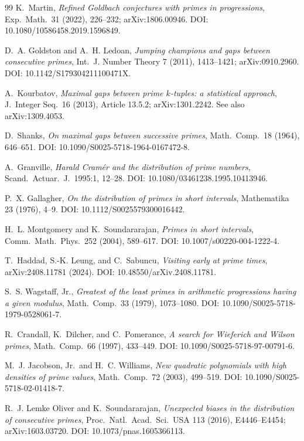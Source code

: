 \documentclass[11pt]{article}
\theoremstyle{definition}
\begin{document}
\begin{thebibliography}{99}
 K.~Martin,
\emph{Refined Goldbach conjectures with primes in progressions},
Exp.\ Math.\ 31 (2022), 226--232; arXiv:1806.00946.
DOI: 10.1080/10586458.2019.1596849.

 D.~A. Goldston and A.~H. Ledoan,
\emph{Jumping champions and gaps between consecutive primes},
Int.\ J. Number Theory 7 (2011), 1413--1421; arXiv:0910.2960.
DOI: 10.1142/S179304211100471X.

 A.~Kourbatov,
\emph{Maximal gaps between prime $k$-tuples: a statistical approach},
J.~Integer Seq.\ 16 (2013), Article 13.5.2; arXiv:1301.2242.  See also
arXiv:1309.4053.

 D.~Shanks,
\emph{On maximal gaps between successive primes},
Math.\ Comp.\ 18 (1964), 646--651.
DOI: 10.1090/S0025-5718-1964-0167472-8.

 A.~Granville,
\emph{Harald Cram\'er and the distribution of prime numbers},
Scand.\ Actuar.\ J.\ 1995:1, 12--28.
DOI: 10.1080/03461238.1995.10413946.

 P.~X. Gallagher,
\emph{On the distribution of primes in short intervals},
Mathematika 23 (1976), 4--9.  DOI: 10.1112/S0025579300016442.

 H.~L. Montgomery and K.~Soundararajan,
\emph{Primes in short intervals},
Comm.\ Math.\ Phys.\ 252 (2004), 589--617.
DOI: 10.1007/s00220-004-1222-4.

 T.~Haddad, S.-K. Leung, and C.~Sabuncu,
\emph{Visiting early at prime times}, arXiv:2408.11781 (2024).
DOI: 10.48550/arXiv.2408.11781.

 S.~S. Wagstaff, Jr.,
\emph{Greatest of the least primes in arithmetic progressions having a
given modulus}, Math.\ Comp.\ 33 (1979), 1073--1080.
DOI: 10.1090/S0025-5718-1979-0528061-7.

 R.~Crandall, K.~Dilcher, and C.~Pomerance,
\emph{A search for Wieferich and Wilson primes},
Math.\ Comp.\ 66 (1997), 433--449.
DOI: 10.1090/S0025-5718-97-00791-6.

 M.~J. Jacobson, Jr.\ and H.~C. Williams,
\emph{New quadratic polynomials with high densities of prime values},
Math.\ Comp.\ 72 (2003), 499--519.
DOI: 10.1090/S0025-5718-02-01418-7.

 R.~J. Lemke Oliver and K.~Soundararajan,
\emph{Unexpected biases in the distribution of consecutive primes},
Proc.\ Natl.\ Acad.\ Sci.\ USA 113 (2016), E4446--E4454;
arXiv:1603.03720.  DOI: 10.1073/pnas.1605366113.


\end{thebibliography}
\end{document}
